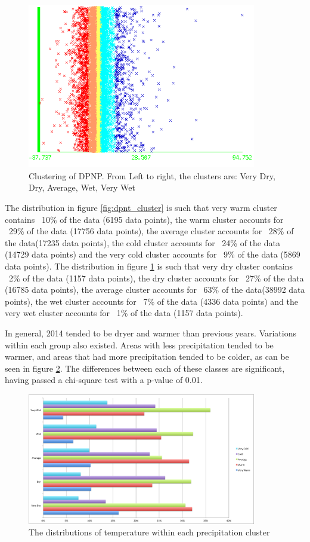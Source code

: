 \documentclass[11pt]{article}
\begin{document}
\begin{figure}
\centering
\includegraphics[width=10cm]{dpnp_cluster}
\caption{Clustering of DPNP. From Left to right, the clusters are: Very Dry, Dry, Average, Wet, Very Wet}
\label{fig:dpnp_cluster}
\end{figure}


The distribution in figure \ref{fig:dpnt_cluster} is such that very warm cluster contains ~10\% of the data (6195 data points), the warm cluster accounts for ~29\% of the data (17756 data points), the average cluster accounts for ~28\% of the data(17235 data points), the cold cluster accounts for ~24\% of the data (14729 data points) and the very cold cluster accounts for ~9\% of the data (5869 data points). The distribution in figure \ref{fig:dpnp_cluster} is such that very dry cluster contains ~2\% of the data (1157 data points), the dry cluster accounts for ~27\% of the data (16785 data points), the average cluster accounts for ~63\% of the data(38992 data points), the wet cluster accounts for ~7\% of the data (4336 data points) and the very wet cluster accounts for ~1\% of the data (1157 data points).

In general, 2014 tended to be dryer and warmer than previous years. Variations within each group also existed. Areas with less precipitation tended to be warmer, and areas that had more precipitation tended to be colder, as can be seen in figure \ref{fig:class_distributions}. The differences between each of these classes are significant, having passed a chi-square test with a p-value of 0.01.

\begin{figure}
\centering
\includegraphics[width=10cm]{ClassDistributions}
\caption{The distributions of temperature within each precipitation cluster}
\label{fig:class_distributions}
\end{figure}
\end{document}
